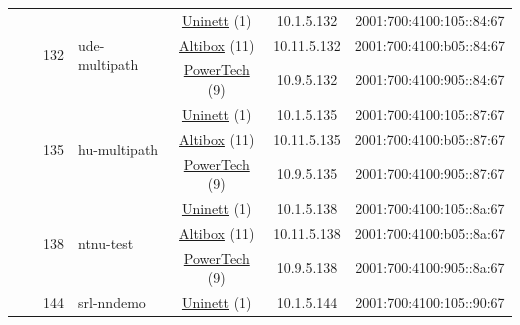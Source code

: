 \begin{small}
\begin{center}
\begin{longtable}{|c|c|c|c|c|c|c|c|}
  &  & \multirow{3}{*}{\tiny{132}} & \multicolumn{1}{|l|}{\multirow{3}{*}{\tiny{ude-multipath}}} & \multicolumn{2}{|c|}{\tiny{\href{https://www.uninett.no}{Uninett} (1)}} & \tiny{10.1.5.132} & \tiny{2001:700:4100:105::84:67} \\* \cline{5-5}\cline{6-6}\cline{7-7}\cline{8-8}
  &  &  &  & \multicolumn{2}{|c|}{\tiny{\href{https://www.altibox.no}{Altibox} (11)}} & \tiny{10.11.5.132} & \tiny{2001:700:4100:b05::84:67} \\* \cline{5-5}\cline{6-6}\cline{7-7}\cline{8-8}
  &  &  &  & \multicolumn{2}{|c|}{\tiny{\href{http://www.powertech.no}{PowerTech} (9)}} & \tiny{10.9.5.132} & \tiny{2001:700:4100:905::84:67} \\* \cline{3-3}\cline{4-4}\cline{5-5}\cline{6-6}\cline{7-7}\cline{8-8}
  &  & \multirow{3}{*}{\tiny{135}} & \multicolumn{1}{|l|}{\multirow{3}{*}{\tiny{hu-multipath}}} & \multicolumn{2}{|c|}{\tiny{\href{https://www.uninett.no}{Uninett} (1)}} & \tiny{10.1.5.135} & \tiny{2001:700:4100:105::87:67} \\* \cline{5-5}\cline{6-6}\cline{7-7}\cline{8-8}
  &  &  &  & \multicolumn{2}{|c|}{\tiny{\href{https://www.altibox.no}{Altibox} (11)}} & \tiny{10.11.5.135} & \tiny{2001:700:4100:b05::87:67} \\* \cline{5-5}\cline{6-6}\cline{7-7}\cline{8-8}
  &  &  &  & \multicolumn{2}{|c|}{\tiny{\href{http://www.powertech.no}{PowerTech} (9)}} & \tiny{10.9.5.135} & \tiny{2001:700:4100:905::87:67} \\* \cline{3-3}\cline{4-4}\cline{5-5}\cline{6-6}\cline{7-7}\cline{8-8}
  &  & \multirow{3}{*}{\tiny{138}} & \multicolumn{1}{|l|}{\multirow{3}{*}{\tiny{ntnu-test}}} & \multicolumn{2}{|c|}{\tiny{\href{https://www.uninett.no}{Uninett} (1)}} & \tiny{10.1.5.138} & \tiny{2001:700:4100:105::8a:67} \\* \cline{5-5}\cline{6-6}\cline{7-7}\cline{8-8}
  &  &  &  & \multicolumn{2}{|c|}{\tiny{\href{https://www.altibox.no}{Altibox} (11)}} & \tiny{10.11.5.138} & \tiny{2001:700:4100:b05::8a:67} \\* \cline{5-5}\cline{6-6}\cline{7-7}\cline{8-8}
  &  &  &  & \multicolumn{2}{|c|}{\tiny{\href{http://www.powertech.no}{PowerTech} (9)}} & \tiny{10.9.5.138} & \tiny{2001:700:4100:905::8a:67} \\* \cline{3-3}\cline{4-4}\cline{5-5}\cline{6-6}\cline{7-7}\cline{8-8}
  &  & \multirow{3}{*}{\tiny{144}} & \multicolumn{1}{|l|}{\multirow{3}{*}{\tiny{srl-nndemo}}} & \multicolumn{2}{|c|}{\tiny{\href{https://www.uninett.no}{Uninett} (1)}} & \tiny{10.1.5.144} & \tiny{2001:700:4100:105::90:67} \\* \cline{5-5}\cline{6-6}\cline{7-7}\cline{8-8}

\end{longtable}
\end{center}
\end{small}
